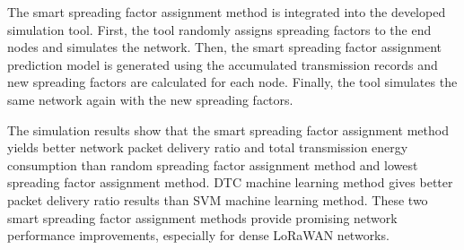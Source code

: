 The smart spreading factor assignment method is integrated into the developed simulation tool. First, the tool randomly assigns spreading factors to the end nodes and simulates the network. Then, the smart spreading factor assignment prediction model is generated using the accumulated transmission records and new spreading factors are calculated for each node. Finally, the tool simulates the same network again with the new spreading factors.

The simulation results show that the smart spreading factor assignment method yields better network packet delivery ratio and total transmission energy consumption than random spreading factor assignment method and lowest spreading factor assignment method. DTC machine learning method gives better packet delivery ratio results than SVM machine learning method. These two smart spreading factor assignment methods provide promising network performance improvements, especially for dense LoRaWAN networks.
